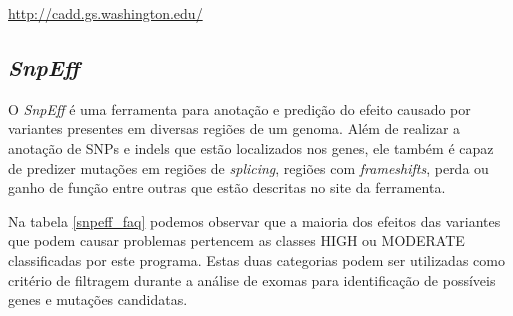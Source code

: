 \url{http://cadd.gs.washington.edu/}


\subsection{\textit{SnpEff}}

O \textit{SnpEff} é uma ferramenta para anotação e predição do efeito causado por variantes presentes em diversas regiões de um genoma. Além de realizar a anotação de SNPs e indels que estão localizados nos genes, ele também é capaz de predizer mutações em regiões de \textit{splicing}, regiões com \textit{frameshifts}, perda ou ganho de função entre outras que estão descritas no site da ferramenta.

Na tabela \ref{snpeff_faq} podemos observar que a maioria dos efeitos das variantes que podem causar problemas pertencem as classes HIGH ou MODERATE classificadas por este programa. Estas duas categorias podem ser utilizadas como critério de filtragem durante a análise de exomas para identificação de possíveis genes e mutações candidatas.


